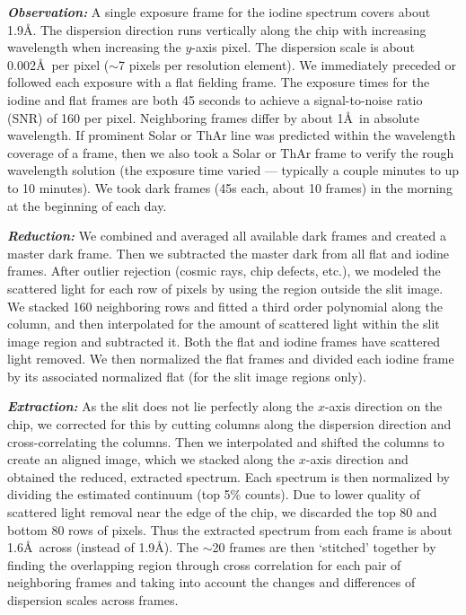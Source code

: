 \textbf{\textit{Observation:}} A single exposure frame for the iodine
spectrum covers about 1.9\AA. The dispersion direction runs vertically
along the chip with increasing wavelength when increasing the $y$-axis
pixel. The dispersion scale is about 0.002\AA\ per pixel ($\sim$7
pixels per resolution element). We immediately preceded or followed
each exposure with a flat fielding frame. The exposure times for the
iodine and flat frames are both 45 seconds to achieve a
signal-to-noise ratio (SNR) of 160 per pixel. Neighboring frames
differ by about 1\AA\ in absolute wavelength. If prominent Solar or
ThAr line was predicted within the wavelength coverage of a frame,
then we also took a Solar or ThAr frame to verify the rough wavelength
solution (the exposure time varied --- typically a couple minutes to
up to 10 minutes). We took dark frames (45s each, about 10 frames) in
the morning at the beginning of each day.

\textbf{\textit{Reduction:}} We combined and averaged all available
dark frames and created a master dark frame. Then we subtracted the
master dark from all flat and iodine frames. After outlier rejection
(cosmic rays, chip defects, etc.), we modeled the scattered light for
each row of pixels by using the region outside the slit image.  We
stacked 160 neighboring rows and fitted a third order polynomial along
the column, and then interpolated for the amount of scattered light
within the slit image region and subtracted it. Both the flat and
iodine frames have scattered light removed. We then normalized the
flat frames and divided each iodine frame by its associated normalized
flat (for the slit image regions only).

\textbf{\textit{Extraction:}} As the slit does not lie perfectly along
the $x$-axis direction on the chip, we corrected for this by cutting
columns along the dispersion direction and cross-correlating the
columns. Then we interpolated and shifted the columns to create an
aligned image, which we stacked along the $x$-axis direction and
obtained the reduced, extracted spectrum. Each spectrum is then
normalized by dividing the estimated continuum (top 5\% counts). Due
to lower quality of scattered light removal near the edge of the chip,
we discarded the top 80 and bottom 80 rows of pixels. Thus the
extracted spectrum from each frame is about 1.6\AA\ across (instead of
1.9\AA). The $\sim$20 frames are then `stitched' together by finding
the overlapping region through cross correlation for each pair of
neighboring frames and taking into account the changes and differences
of dispersion scales across frames.

